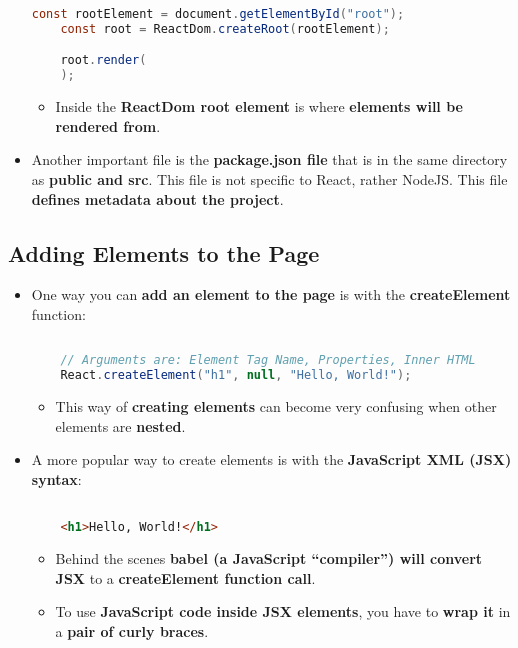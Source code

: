 \documentclass{article}
\begin{document}
\begin{itemize}
\begin{lstlisting}[language=Java]
    const rootElement = document.getElementById("root");
    const root = ReactDom.createRoot(rootElement);

    root.render(
    );
        \end{lstlisting}
        \begin{itemize}
            \item Inside the \textbf{ReactDom root element} is where \textbf{elements will be rendered from}.
        \end{itemize}
        \item Another important file is the \textbf{package.json file} that is in the same directory as \textbf{public and src}. This file is not specific to React, rather NodeJS. This file \textbf{defines metadata about the project}.
    \end{itemize}    

    \subsection*{Adding Elements to the Page}
    \begin{itemize}
        \item One way you can \textbf{add an element to the page} is with the \textbf{createElement} function:
        \begin{lstlisting}[language=Java]
            
    // Arguments are: Element Tag Name, Properties, Inner HTML
    React.createElement("h1", null, "Hello, World!");
        \end{lstlisting}
        \begin{itemize}
            \item This way of \textbf{creating elements} can become very confusing when other elements are \textbf{nested}.
        \end{itemize}
        \item A more popular way to create elements is with the \textbf{JavaScript XML (JSX) syntax}:
            \begin{lstlisting}[language=HTML]

    <h1>Hello, World!</h1>
            \end{lstlisting}
            \begin{itemize}
                \item Behind the scenes \textbf{babel (a JavaScript ``compiler'') will convert} \textbf{JSX} to a \textbf{createElement function call}.
                \item To use \textbf{JavaScript code inside JSX elements}, you have to \textbf{wrap it} in a \textbf{pair of curly braces}.
            \end{itemize}
    \end{itemize}
\end{document}
